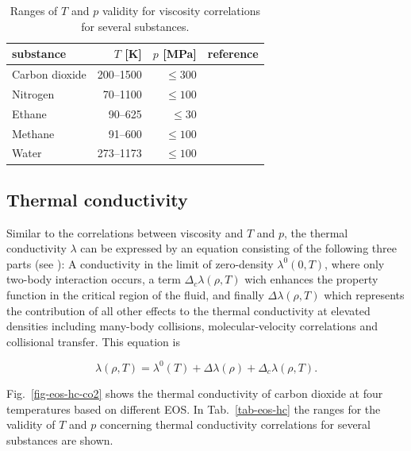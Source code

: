 \begin{table}[H]
  \caption{\label{tab-eos-visc}Ranges of $T$ and $p$ validity for viscosity correlations for several substances.}
  \begin{center}
  \begin{tabular}{lrrl}
  \toprule
  substance 		& $T$ [K]		& $p$ [MPa] 	& reference \\
  \midrule
  Carbon dioxide 	& 200--1500		& $\leq{300}$ 	& \cite{FenWakVes:98}\\
  Nitrogen       	& 70--1100		& $\leq{100}$ 	& \cite{SteKraLae:87}\\  
  Ethane         	& 90--625		& $\leq{30}$ 	& \cite{FriIngEly:91}\\ 
  Methane       	&	91--600		& $\leq{100}$	& \cite{FriElyIng:89}\\  
  Water          	& 273--1173		& $\leq{100}$	& \cite{IAPWS:08a}\\
  \bottomrule
 \end{tabular}
 \end{center}
\end{table}
  


\subsection {Thermal conductivity} \label{sec-thermal-conductivity}
Similar to the correlations between viscosity and $T$ and $p$, the thermal conductivity $\lambda$ can be expressed by an equation consisting of the following three parts (see \cite{VesWak:90}): A conductivity in the limit of zero-density $\lambda^0(0,T)$, where only two-body interaction occurs, a term $\Delta_c\lambda (\rho,T)$ wich enhances the property function in the critical region of the fluid, and finally $\Delta\lambda (\rho,T)$ which represents the contribution of all other effects to the thermal conductivity at elevated densities including many-body collisions, molecular-velocity correlations and collisional transfer. This equation is

\begin{equation}
\lambda (\rho,T) = \lambda^0 (T) + \Delta\lambda (\rho)+ \Delta_c \lambda (\rho,T).
\label{EqEOS_visc}
\end{equation}

Fig.~\ref{fig-eos-hc-co2} shows the thermal conductivity of carbon dioxide at four temperatures based on different EOS. In Tab.~\ref{tab-eos-hc} the ranges for the validity of $T$ and $p$ concerning thermal conductivity correlations for several substances are shown.

